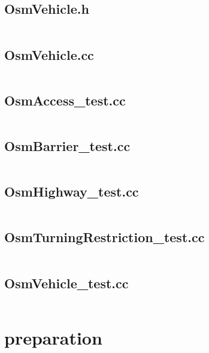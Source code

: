 \documentclass[../main.tex]{subfiles}
\begin{document}
\subsection{OsmVehicle.h}\label{lst:osm-vehicle-h}
\inputminted[linenos=true]{cpp}{parts/code/osm/OsmVehicle.h}

\subsection{OsmVehicle.cc}\label{lst:osm-vehicle-cc}
\inputminted[linenos=true]{cpp}{parts/code/osm/OsmVehicle.cc}

\subsection{OsmAccess\_test.cc}\label{lst:osm-access-test-cc}
\inputminted[linenos=true]{cpp}{parts/code/osm/catchtest/OsmAccess_test.cc}

\subsection{OsmBarrier\_test.cc}\label{lst:osm-barrier-test-cc}
\inputminted[linenos=true]{cpp}{parts/code/osm/catchtest/OsmBarrier_test.cc}

\subsection{OsmHighway\_test.cc}\label{lst:osm-highway-test-cc}
\inputminted[linenos=true]{cpp}{parts/code/osm/catchtest/OsmHighway_test.cc}

\subsection{OsmTurningRestriction\_test.cc}\label{lst:osm-turning-restriction-test-cc}
\inputminted[linenos=true]{cpp}{parts/code/osm/catchtest/OsmTurningRestrictions_test.cc}

\subsection{OsmVehicle\_test.cc}\label{lst:osm-vehicle-test-cc}
\inputminted[linenos=true]{cpp}{parts/code/osm/catchtest/OsmVehicle_test.cc}


\section{preparation}
\end{document}
